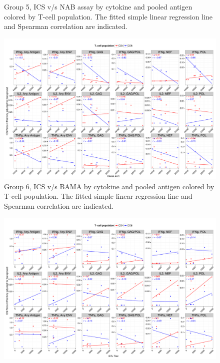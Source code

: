 \documentclass[11pt]{article}\usepackage[]{graphicx}\usepackage[]{color}
\makeatletter
\def\maxwidth{ %
  \ifdim\Gin@nat@width>\linewidth
    \linewidth
  \else
    \Gin@nat@width
  \fi
}
\newenvironment{knitrout}{}{} %
\makeatother
\begin{document}
\begin{landscape}
\begin{figure}[H]
\begin{center}
\begin{knitrout}
\end{knitrout}
\caption{Group 5, ICS v/s NAB assay by cytokine and pooled antigen colored by T-cell population. The fitted simple linear regression line and Spearman correlation are indicated.}
\end{center}
\end{figure}



\begin{figure}[H]
\begin{center}
\begin{knitrout}
\color{fgcolor}
\includegraphics[width=\maxwidth]{figure/corrplot_Grp6_BAMA_pooledAntigen-1} 

\end{knitrout}
\caption{Group 6, ICS v/s BAMA by cytokine and pooled antigen colored by T-cell population. The fitted simple linear regression line and Spearman correlation are indicated.}
\end{center}
\end{figure}


\begin{figure}[H]
\begin{center}
\begin{knitrout}
\color{fgcolor}
\includegraphics[width=\maxwidth]{figure/corrplot_Grp6_ADCC_pooledAntigen-1} 


\end{knitrout}
\end{center}
\end{figure}
\end{landscape}
\end{document}
